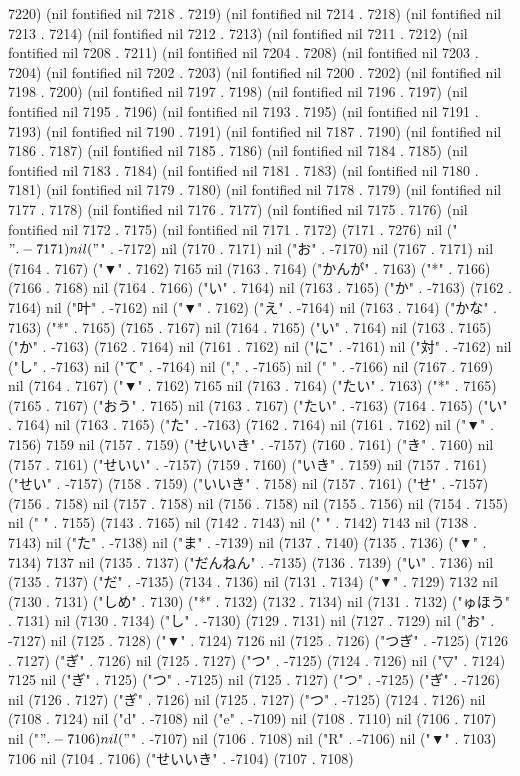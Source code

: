 7220) (nil fontified nil 7218 . 7219) (nil fontified nil 7214 . 7218) (nil fontified nil 7213 . 7214) (nil fontified nil 7212 . 7213) (nil fontified nil 7211 . 7212) (nil fontified nil 7208 . 7211) (nil fontified nil 7204 . 7208) (nil fontified nil 7203 . 7204) (nil fontified nil 7202 . 7203) (nil fontified nil 7200 . 7202) (nil fontified nil 7198 . 7200) (nil fontified nil 7197 . 7198) (nil fontified nil 7196 . 7197) (nil fontified nil 7195 . 7196) (nil fontified nil 7193 . 7195) (nil fontified nil 7191 . 7193) (nil fontified nil 7190 . 7191) (nil fontified nil 7187 . 7190) (nil fontified nil 7186 . 7187) (nil fontified nil 7185 . 7186) (nil fontified nil 7184 . 7185) (nil fontified nil 7183 . 7184) (nil fontified nil 7181 . 7183) (nil fontified nil 7180 . 7181) (nil fontified nil 7179 . 7180) (nil fontified nil 7178 . 7179) (nil fontified nil 7177 . 7178) (nil fontified nil 7176 . 7177) (nil fontified nil 7175 . 7176) (nil fontified nil 7172 . 7175) (nil fontified nil 7171 . 7172) (7171 . 7276) nil ("$" . -7171) nil ("$" . -7172) nil (7170 . 7171) nil ("お" . -7170) nil (7167 . 7171) nil (7164 . 7167) ("▼" . 7162) 7165 nil (7163 . 7164) ("かんが" . 7163) ("*" . 7166) (7166 . 7168) nil (7164 . 7166) ("い" . 7164) nil (7163 . 7165) ("か" . -7163) (7162 . 7164) nil ("叶" . -7162) nil ("▼" . 7162) ("え" . -7164) nil (7163 . 7164) ("かな" . 7163) ("*" . 7165) (7165 . 7167) nil (7164 . 7165) ("い" . 7164) nil (7163 . 7165) ("か" . -7163) (7162 . 7164) nil (7161 . 7162) nil ("に" . -7161) nil ("対" . -7162) nil ("し" . -7163) nil ("て" . -7164) nil ("," . -7165) nil (" " . -7166) nil (7167 . 7169) nil (7164 . 7167) ("▼" . 7162) 7165 nil (7163 . 7164) ("たい" . 7163) ("*" . 7165) (7165 . 7167) ("おう" . 7165) nil (7163 . 7167) ("たい" . -7163) (7164 . 7165) ("い" . 7164) nil (7163 . 7165) ("た" . -7163) (7162 . 7164) nil (7161 . 7162) nil ("▼" . 7156) 7159 nil (7157 . 7159) ("せいいき" . -7157) (7160 . 7161) ("き" . 7160) nil (7157 . 7161) ("せいい" . -7157) (7159 . 7160) ("いき" . 7159) nil (7157 . 7161) ("せい" . -7157) (7158 . 7159) ("いいき" . 7158) nil (7157 . 7161) ("せ" . -7157) (7156 . 7158) nil (7157 . 7158) nil (7156 . 7158) nil (7155 . 7156) nil (7154 . 7155) nil (" " . 7155) (7143 . 7165) nil (7142 . 7143) nil (" " . 7142) 7143 nil (7138 . 7143) nil ("た" . -7138) nil ("ま" . -7139) nil (7137 . 7140) (7135 . 7136) ("▼" . 7134) 7137 nil (7135 . 7137) ("だんねん" . -7135) (7136 . 7139) ("い" . 7136) nil (7135 . 7137) ("だ" . -7135) (7134 . 7136) nil (7131 . 7134) ("▼" . 7129) 7132 nil (7130 . 7131) ("しめ" . 7130) ("*" . 7132) (7132 . 7134) nil (7131 . 7132) ("ゅほう" . 7131) nil (7130 . 7134) ("し" . -7130) (7129 . 7131) nil (7127 . 7129) nil ("お" . -7127) nil (7125 . 7128) ("▼" . 7124) 7126 nil (7125 . 7126) ("つぎ" . -7125) (7126 . 7127) ("ぎ" . 7126) nil (7125 . 7127) ("つ" . -7125) (7124 . 7126) nil ("▽" . 7124) 7125 nil ("ぎ" . 7125) ("つ" . -7125) nil (7125 . 7127) ("つ" . -7125) ("ぎ" . -7126) nil (7126 . 7127) ("ぎ" . 7126) nil (7125 . 7127) ("つ" . -7125) (7124 . 7126) nil (7108 . 7124) nil ("d" . -7108) nil ("e" . -7109) nil (7108 . 7110) nil (7106 . 7107) nil ("$" . -7106) nil ("$" . -7107) nil (7106 . 7108) nil ("R" . -7106) nil ("▼" . 7103) 7106 nil (7104 . 7106) ("せいいき" . -7104) (7107 . 7108) 